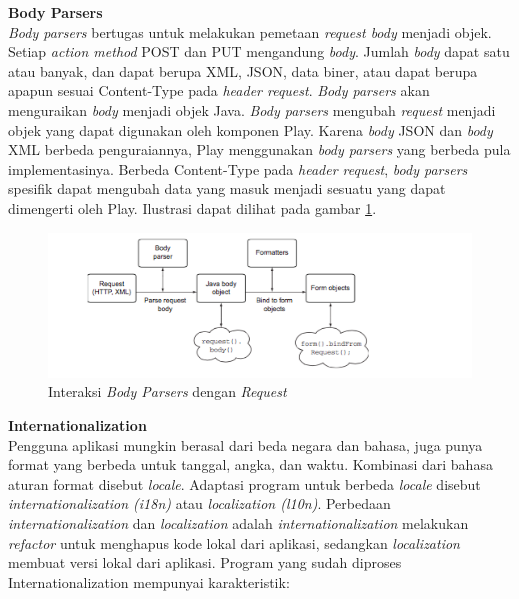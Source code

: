 \documentclass[a4paper,twoside]{article}
\begin{document}
\begin{enumerate}
\textbf{Body Parsers}\\
\textit{Body parsers} bertugas untuk melakukan pemetaan \textit{request body} menjadi objek. Setiap \textit{action method} POST dan PUT mengandung \textit{body}. Jumlah \textit{body} dapat satu atau banyak, dan dapat berupa XML, JSON, data biner, atau dapat berupa apapun sesuai Content-Type pada \textit{header request}. \textit{Body parsers} akan menguraikan \textit{body} menjadi objek Java. \textit{Body parsers} mengubah \textit{request} menjadi objek yang dapat digunakan oleh komponen Play. Karena \textit{body} JSON dan \textit{body} XML berbeda penguraiannya, Play menggunakan \textit{body parsers} yang berbeda pula implementasinya. Berbeda Content-Type pada \textit{header request}, \textit{body parsers} spesifik dapat mengubah data yang masuk menjadi sesuatu yang dapat dimengerti oleh Play. Ilustrasi dapat dilihat pada gambar \ref{fig:2_play_bodyparsers}.

\begin{figure}[H]
  \centering
  \includegraphics[scale=0.7]{Gambar/play-bodyparsers}
  \caption{Interaksi \textit{Body Parsers} dengan \textit{Request}} 
  \label{fig:2_play_bodyparsers}
\end{figure}



\textbf{Internationalization}\\
Pengguna aplikasi mungkin berasal dari beda negara dan bahasa, juga punya format yang berbeda untuk tanggal, angka, dan waktu. Kombinasi dari bahasa aturan format disebut \textit{locale}. Adaptasi program untuk berbeda \textit{locale} disebut \textit{internationalization (i18n)} atau \textit{localization (l10n)}. Perbedaan \textit{internationalization} dan \textit{localization} adalah \textit{internationalization} melakukan \textit{refactor} untuk menghapus kode lokal dari aplikasi, sedangkan \textit{localization} membuat versi lokal dari aplikasi. Program yang sudah diproses Internationalization mempunyai karakteristik:


\end{enumerate}
\end{document}
